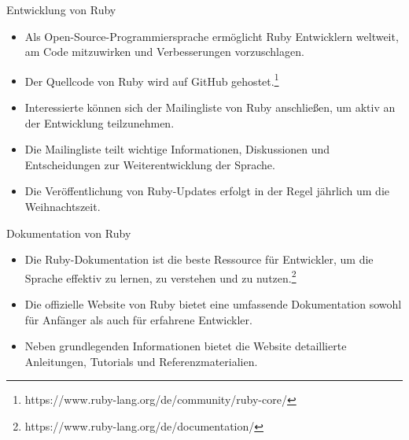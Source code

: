 \documentclass{beamer}
\begin{document}
\begin{frame}{Entwicklung von Ruby}
  \begin{itemize}
    \item Als Open-Source-Programmiersprache ermöglicht Ruby Entwicklern weltweit, am Code mitzuwirken und Verbesserungen vorzuschlagen.
    \item Der Quellcode von Ruby wird auf GitHub gehostet.\footnote{https://www.ruby-lang.org/de/community/ruby-core/}
    \item Interessierte können sich der Mailingliste von Ruby anschließen, um aktiv an der Entwicklung teilzunehmen.
    \item Die Mailingliste teilt wichtige Informationen, Diskussionen und Entscheidungen zur Weiterentwicklung der Sprache.
    \item Die Veröffentlichung von Ruby-Updates erfolgt in der Regel jährlich um die Weihnachtszeit.
  \end{itemize}
\end{frame}
\begin{frame}{Dokumentation von Ruby}
  \begin{itemize}
    \item Die Ruby-Dokumentation ist die beste Ressource für Entwickler, um die Sprache effektiv zu lernen, zu verstehen und zu nutzen.\footnote{https://www.ruby-lang.org/de/documentation/}
    \item Die offizielle Website von Ruby bietet eine umfassende Dokumentation sowohl für Anfänger als auch für erfahrene Entwickler.
    \item Neben grundlegenden Informationen bietet die Website detaillierte Anleitungen, Tutorials und Referenzmaterialien.
  \end{itemize}
\end{frame}
\end{document}
